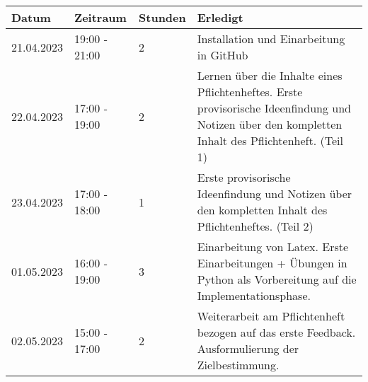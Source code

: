 \begin{tabular}{|l|l|l|l|}
	\hline
	Datum & Zeitraum & Stunden & Erledigt \\
	\hline
	21.04.2023 & 19:00 - 21:00 & 2 & Installation und Einarbeitung in GitHub\\
	22.04.2023 & 17:00 - 19:00 & 2 & Lernen über die Inhalte eines Pflichtenheftes. Erste provisorische Ideenfindung und Notizen über den kompletten Inhalt des Pflichtenheft. (Teil 1) \\
	23.04.2023 & 17:00 - 18:00 & 1 & Erste provisorische Ideenfindung und Notizen über den kompletten Inhalt des Pflichtenheftes. (Teil 2) \\
	01.05.2023 & 16:00 - 19:00 & 3 & Einarbeitung von Latex. Erste Einarbeitungen + Übungen in Python als Vorbereitung auf die Implementationsphase. \\
	02.05.2023 & 15:00 - 17:00 & 2 & Weiterarbeit am Pflichtenheft bezogen auf das erste Feedback. Ausformulierung der Zielbestimmung.  \\
	\hline
\end{tabular}